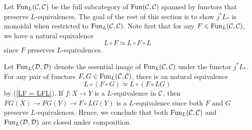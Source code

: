 Let $\operatorname{Fun}_L({\mathcal{C}},{\mathcal{C}})$ be the full subcategory of $\operatorname{Fun}({\mathcal{C}},{\mathcal{C}})$ spanned by functors that preserve $L$-equivalences. 
The goal of the rest of this section is to show $j^*L_*$ is monoidal when restricted to $\operatorname{Fun}_L({\mathcal{C}},{\mathcal{C}})$.
Note first that for any $F\in \operatorname{Fun}_L({\mathcal{C}},{\mathcal{C}})$, we have a natural equivalence
\begin{equation}
\label{LF = LFL}
	L\circ F \simeq L\circ F\circ L
\end{equation}
since $F$ preserves $L$-equivalences.
\begin{remark}
Let $\operatorname{Fun}_L({\mathcal{D}},{\mathcal{D}})$ denote the essential image of $\operatorname{Fun}_L({\mathcal{C}},{\mathcal{C}})$ under the functor $j^*L_*$.
For any pair of functors $F,G\in \operatorname{Fun}_L({\mathcal{C}},{\mathcal{C}})$, there is an natural equivalence
$$
L\circ (F\circ G) \simeq L\circ (F\circ L G)
$$ 
by (\ref{LF = LFL}).
If $f:X\to Y$ is a $L$-equivalence in ${\mathcal{C}}$, then
$FG(X) \to FG(Y) \to F\circ LG(Y)$ is a $L$-equivalence since both $F$ and $G$ preserve $L$-equivalences.
Hence, we conclude that both $\operatorname{Fun}_L({\mathcal{C}},{\mathcal{C}})$ and $\operatorname{Fun}_L({\mathcal{D}},{\mathcal{D}})$ are closed under composition.
\end{remark}

